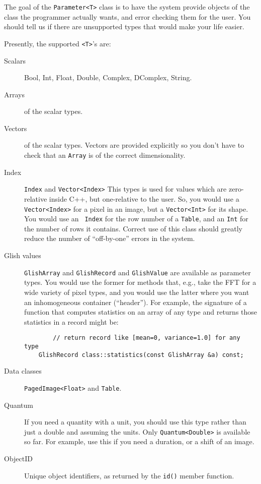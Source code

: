The goal of the {\tt Parameter<T>} class is to have the system provide
objects of the class the programmer actually wants, and error checking
them for the user. You should tell us if there are unsupported types that
would make your life easier.

Presently, the supported {\tt <T>}'s are:
\begin{description}
    \item[Scalars] Bool, Int, Float, Double, Complex, DComplex, String.
    \item[Arrays] of the scalar types.
    \item[Vectors] of the scalar types. Vectors are provided explicitly
    so you don't have to check that an {\tt Array} is of the correct
    dimensionality.
    \item[Index] {\tt Index} and {\tt Vector<Index>} This types is used
    for values which are zero-relative inside C++, but one-relative to
    the user. So, you would use a {\tt Vector<Index>} for a pixel in an
    image, but a {\tt Vector<Int>} for its shape. You would use an {\tt
    Index} for the row number of a {\tt Table}, and an {\tt Int} for the
    number of rows it contains. Correct use of this class should greatly
    reduce the number of ``off-by-one'' errors in the system.
    \item[Glish values] {\tt GlishArray} and {\tt GlishRecord} and
    {\tt GlishValue} are
    available as parameter types. You would use the former for methods
    that, e.g., take the FFT for a wide variety of pixel types, and you
    would use the latter where you want an inhomogeneous container
    (``header''). For example, the signature of a function that
    computes statistics on an array of any type and returns those
    statistics in a record might be:
    \begin{verbatim}
        // return record like [mean=0, variance=1.0] for any type
	GlishRecord class::statistics(const GlishArray &a) const;
    \end{verbatim}
    \item[Data classes] {\tt PagedImage<Float>} and {\tt Table}.
    \item[Quantum] If you need a quantity with a unit, you should use this
                   type rather than just a double and assuming the units.
                   Only {\tt Quantum<Double>} is available so far. For
                   example, use this if you need a duration, or a shift
                   of an image.
    \item[ObjectID] Unique object identifiers, as returned by the {\tt id()}
                    member function.
\end{description}

